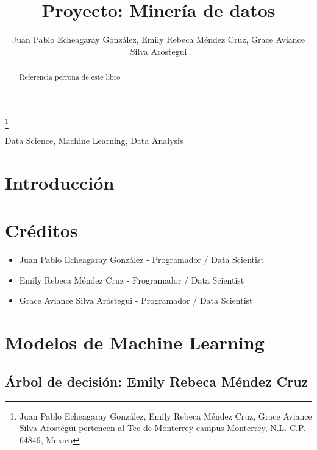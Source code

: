 \documentclass[journal]{IEEEtran}                                                          %
\title{\LARGE \bf Proyecto: Minería de datos}
\author{Juan Pablo Echeagaray González, Emily Rebeca Méndez Cruz, Grace Aviance Silva Arostegui}%
\begin{document}
    \thanks{Juan Pablo Echeagaray González, Emily Rebeca Méndez Cruz, Grace Aviance Silva Arostegui pertencen al Tec de Monterrey campus Monterrey, N.L. C.P. 64849, Mexico {\tt\small}}

    \maketitle

    \thispagestyle{empty}
    \pagestyle{empty}
    \begin{abstract}
        Referencia perrona de este libro \cite{geron-2019}
    \end{abstract}

    \begin{IEEEkeywords} 
    Data Science, Machine Learning, Data Analysis
    \end{IEEEkeywords}

    \section{Introducción} \label{introduction}

    \section{Créditos} \label{credits}
       
        \begin{itemize}
            \item Juan Pablo Echeagaray González - Programador / Data Scientist
            \item Emily Rebeca Méndez Cruz - Programador / Data Scientist
            \item Grace Aviance Silva Aróstegui - Programador / Data Scientist
        \end{itemize}

    \section{Modelos de Machine Learning} \label{modelos}

        \subsection{Árbol de decisión: Emily Rebeca Méndez Cruz} \label{decision-tree}
\end{document}
